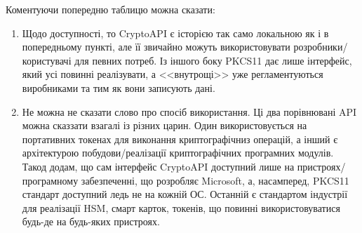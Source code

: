 Коментуючи попередню таблицю можна сказати:
\begin{enumerate}

    \item Щодо доступності, то CryptoAPI є історією так само локальною як і в попередньому пункті, але її звичайно можуть використовувати розробники/користувачі для певних потреб. Із іншого боку PKCS11 дає лише інтерфейс, який усі повинні реалізувати, а <<внутрощі>> уже регламентуються виробниками та тим як вони записують дані. 
    \item Не можна не сказати слово про спосіб використання. Ці два порівнювані API можна сказзати взагалі із різних царин. Один використовується на портативних токенах для виконання криптографічниз операцій, а інший є архітектурою побудови/реалізації криптографічних програмних модулів. Такод додам, що сам інтерфейс CryptoAPI доступний лише на пристроях/програмному забезпеченні, що розробляє Microsoft, а, насамперед, PKCS11 стандарт доступний ледь не на кожній ОС. Останній є стандартом індустрії для реалізації HSM, смарт карток, токенів, що повинні використовуватися будь-де на будь-яких пристроях.

\end{enumerate}






